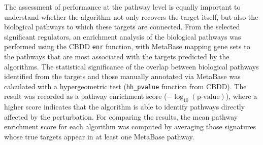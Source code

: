 The assessment of performance at the pathway level is equally important to understand whether the algorithm not only recovers the target itself, but also the biological pathways to which these targets are connected.
From the selected significant regulators, an enrichment analysis of the biological pathways was performed using the \gls{CBDD} \texttt{enr} function, with MetaBase mapping gene sets to the pathways that are most associated with the targets predicted by the algorithms.
The statistical significance of the overlap between biological pathways identified from the targets and those manually annotated via MetaBase was calculated with a hypergeometric test (\texttt{hh\_pvalue} function from \gls{CBDD}).
The result was recorded as a pathway enrichment score ($-\log_{10}(\text{p-value})$), where a higher score indicates that the algorithm is able to identify pathways directly affected by the perturbation. For comparing the results, the mean pathway enrichment score for each algorithm was computed by averaging those signatures whose true targets appear in at least one MetaBase pathway.

